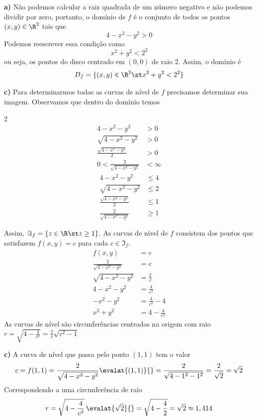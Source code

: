 \documentclass[a4paper,12pt,fleqn]{article}
\begin{document}
\begin{answer}
\textbf{a)} \quad
  Não podemos calcular a raiz quadrada de um número negativo e não
  podemos dividir por zero, portanto, o domínio de $f$ é o conjunto
  de todos os pontos \((x, y)\in\R^2\) tais que
  \[
    4 - x^2 - y^2 > 0
  \]
  Podemos reescrever essa condição como
  \[
    x^2 + y^2 < 2^2
  \]
  ou seja, os pontos do disco centrado em \((0, 0)\) de raio 2.
  Assim, o domínio é
  \[
    D_f = \{(x, y) \in \R^2 \st x^2 + y^2 < 2^2\}
  \]

\clearpage
\textbf{c)} \quad
  Para determinarmos todas as curvas de nível de $f$ precisamos determinar sua
  imagem. Observamos que dentro do domínio temos
  \begin{multicols}{2}
    \begin{align*}
      4 - x^2 - y^2                  & > 0 \\[2mm]
      \sqrt{4 - x^2 - y^2}           & > 0 \\[2mm]
      \frac{\sqrt{4 - x^2 - y^2}}{2} & > 0 \\[2mm]
      0 < \frac{2}{\sqrt{4 - x^2 - y^2}} & < \infty
    \end{align*}
  \newcolumn
    \begin{align*}
      4 - x^2 - y^2                  & \leq 4   \\[2mm]
      \sqrt{4 - x^2 - y^2}           & \leq 2   \\[2mm]
      \frac{\sqrt{4 - x^2 - y^2}}{2} & \leq 1   \\[2mm]
      \frac{2}{\sqrt{4 - x^2 - y^2}} & \geq 1
    \end{align*}
  \end{multicols}
  Assim, \(\Im_f = \left\{z\in\R \st z \geq 1\right\}\).
  As curvas de nível de $f$ consistem dos pontos que satisfazem
  \(
    f(x, y) = c
  \)
  para cada \(c\in\Im_f\).
  \begin{align*}
    f(x, y)                        & = c                 \\[2mm]
    \frac{2}{\sqrt{4 - x^2 - y^2}} & = c                 \\[2mm]
    \sqrt{4 - x^2 - y^2}           & = \frac{2}{c}       \\[2mm]
    4 - x^2 - y^2                  & = \frac{4}{c^2}     \\[2mm]
    - x^2 - y^2                    & = \frac{4}{c^2} -4  \\[2mm]
    x^2 + y^2                      & = 4 - \frac{4}{c^2}
  \end{align*}
  As curvas de nível são circunferências centradas na origem com raio
  \(
    r
    = \sqrt{4 - \frac{4}{c^2}}
    = \frac{2}{c}\sqrt{c^2-1}
  \)

\bigskip
\textbf{c)} \quad
A curva de nível que passa pelo ponto $(1, 1)$ tem o valor
\[
  c
  = f(1, 1)
  = \frac{2}{\sqrt{4 - x^2 - y^2}}\evalat{(1, 1)}{}
  = \frac{2}{\sqrt{4 - 1^2 - 1^2}}
  = \frac{2}{\sqrt{2}}
  = \sqrt{2}
\]
Correspondendo a uma circunferência de raio
\[
  r
  = \sqrt{4 - \frac{4}{c^2}} \,\evalat{\sqrt{2}}{}
  = \sqrt{4 - \frac{4}{2}}
  = \sqrt{2}
  \approx 1,414
\]

\end{answer}

\end{document}
